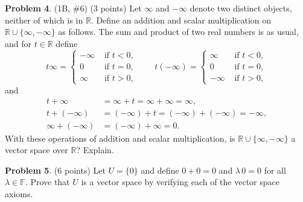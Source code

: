 \documentclass[reqno, 12pt]{amsart}
\theoremstyle{definition}
\newenvironment{problab}[1]
{\noindent\textbf{Problem #1}.}
{\vskip 6pt}
\theoremstyle{remark}
\newcommand{\F}{\mathbb F}
\newcommand{\R}{\mathbb R}
\begin{document}
\begin{problab}{4} (1B, \#6) (3 points)
  Let $\infty$ and $-\infty$ denote two distinct objects, neither of which is in $\R$. Define an addition and scalar multiplication on $\R \cup\{\infty,-\infty\}$ as follows. The sum and product of two real numbers is as usual, and for $t \in \R$ define
$$
t \infty=
\begin{cases}
  -\infty & \text { if } t<0, \\
  0 & \text { if } t=0, \\
  \infty & \text { if } t>0,
\end{cases}
\qquad
t(-\infty)=
\begin{cases}
  \infty & \text { if } t<0, \\
  0 & \text { if } t=0, \\
  -\infty & \text { if } t>0,
\end{cases}
$$
and
$$
\begin{aligned}
  t+\infty & =\infty+t=\infty+\infty=\infty, \\
  t+(-\infty) & =(-\infty)+t=(-\infty)+(-\infty)=-\infty, \\
  \infty+(-\infty) & =(-\infty)+\infty=0 .
\end{aligned}
$$
With these operations of addition and scalar multiplication, is $\R \cup\{\infty,-\infty\}$ a vector space over $\R$? Explain.
\end{problab}

\begin{problab}{5} (6 points)
  Let $U = \{0\}$ and define $0 + 0 = 0$ and $\lambda \, 0 = 0$ for all $\lambda \in \F$. Prove that $U$ is a vector space by verifying each of the vector space axioms.
\end{problab}
\end{document}
